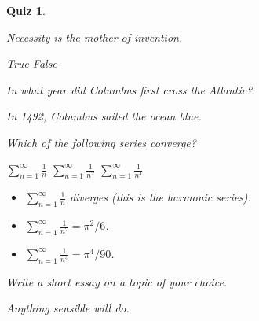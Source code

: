 \documentclass{article}
\theoremstyle{break}
\newcounter{theorem}
\newtheorem{quiz}[theorem]{Quiz}
\begin{document}
\begin{quiz}
\begin{questions} 

\question Necessity is the mother of invention.
\begin{choices}
\correctchoice True 		
\choice False		
\end{choices}

\question In what year did Columbus first cross the Atlantic?
\begin{choices}
\end{choices}
\begin{answer}
In 1492, Columbus sailed the ocean blue.
\end{answer}

\question
\label{qu:series}
Which of the following series converge?
\begin{checkboxes}
\choice $\sum_{n=1}^{\infty}\frac{1}{n}$
\correctchoice $\sum_{n=1}^{\infty}\frac{1}{n^2}$
\correctchoice $\sum_{n=1}^{\infty}\frac{1}{n^4}$
\end{checkboxes}
\begin{answer}
\begin{itemize}
\item $\sum_{n=1}^{\infty}\frac{1}{n}$ diverges (this is the harmonic series). 
\item $\sum_{n=1}^{\infty}\frac{1}{n^2} = \pi^2/6$.
\item $\sum_{n=1}^{\infty}\frac{1}{n^4} = \pi^4/90$.
\end{itemize}
\end{answer}

\question 
Write a short essay on a topic of your choice.  
\begin{answer}
Anything sensible will do.
\end{answer}

\end{questions}
\end{quiz}
\end{document}
